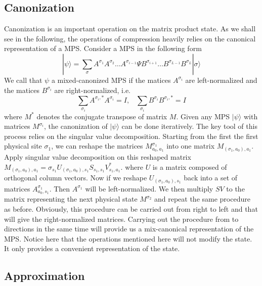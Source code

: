 \documentclass[english]{article}
\begin{document}
\subsection{Canonization}
Canonization is an important operation on the matrix product state. As we shall see in the following, the operations of compression heavily relies on the canonical representation of a MPS. Consider a MPS in the following form
\[
|\psi \rangle =\sum_{\sigma}A^{\sigma_1}A^{\sigma_2}\dots A^{\sigma_{i-1}}\Psi B^{\sigma_{i+1}}\dots B^{\sigma_{L-1}} B^{\sigma_L} |\sigma\rangle
\]
We call that $\psi$ a mixed-canonized MPS if the matices $A^{\sigma_i}$ are left-normalized and the matices $B^{\sigma_i}$ are right-normalized, i.e.
\[
\sum_{\sigma_i} A^{\sigma_i,*}A^{\sigma_i} = I,\;\;\;\sum_{\sigma_i} B^{\sigma_i}B^{\sigma_i,*}=I
\]
where $M^*$ denotes the conjugate transpose of matrix $M$. Given any MPS $|\psi\rangle$ with matrices $M^{\sigma_i}$, the canonization of $|\psi\rangle$ can be done iteratively. The key tool of this process relies on the singular value decomposition. Starting from the first the first physical site $\sigma_1$, we can reshape the matrices $M_{a_0,a_1}^{\sigma_1}$ into one matrix $M_{(\sigma_1,a_0),a_1}$. Apply singular value decomposition on this reshaped matrix $M_{(\sigma_1,a_0),a_1}=\sigma_{s_1} U_{(\sigma_1,a_0),s_1} S_{s_1,s_1} V^{*}_{s_1,a_1}$. where $U$ is a matrix composed of orthogonal column vectors. Now if we reshape $U_{(\sigma_1,a_0),s_1}$ back into a set of matrices $A_{a_0,s_1}^{\sigma_1}$. Then $A^{\sigma_1}$ will be left-normalized. We then multiply $SV$ to the matrix representing the next physical state $M^{\sigma_2}$ and repeat the same procedure as before. Obviously, this procedure can be carried out from right to left and that will give the right-normalized matrices.
Carrying out the procedure from to directions in the same time will provide us a mix-canonical representation of the MPS. Notice here that the operations mentioned here will not modify the state. It only provides a convenient representation of the state.

\subsection{Approximation}
\end{document}
